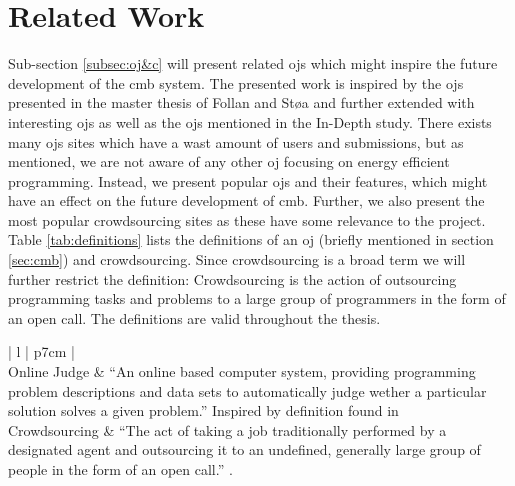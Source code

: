 \section{Related Work}
\label{sec:related}
Sub-section \ref{subsec:oj&c} will present related \gls{ojs} which might inspire the future development of the \gls{cmb} system. The presented work is inspired by the \gls{ojs} presented in the master thesis of Follan and Støa and further extended with interesting \gls{ojs} as well as the \gls{ojs} mentioned in the In-Depth study. There exists many \gls{ojs} sites which have a wast amount of users and submissions, but as mentioned, we are not aware of any other \gls{oj} focusing on energy efficient programming. Instead, we present popular \gls{ojs} and their features, which might have an effect on the future development of \gls{cmb}. Further, we also present the most popular crowdsourcing sites as these have some relevance to the project. Table \ref{tab:definitions} lists the definitions of an \gls{oj} (briefly mentioned in section \ref{sec:cmb}) and crowdsourcing. Since crowdsourcing is a broad term we will further restrict the definition: Crowdsourcing is the action of outsourcing programming tasks and problems to a large group of programmers in the form of an open call. The definitions are valid throughout the thesis. \\


\begin{table}[t!]
    \centering
    \begin{tabular}{ | l | p{7cm} | }
    \hline
     \\
    \hline
    Online Judge & ``An online based computer system, providing programming problem descriptions and data sets to automatically judge wether a particular solution solves a given problem.'' Inspired by definition found in \cite{a:Kurnia2001}  \\ \hline
    Crowdsourcing & ``The act of taking a job traditionally performed by a designated agent and outsourcing it to an undefined, generally large group of people in the form of an open call.'' \cite{CROWDSOURCING}. \\ \hline
    \end{tabular}
    \caption{Defining \gls{ojs} and Crowdsourcing}
    \label{tab:definitions}
\end{table}

